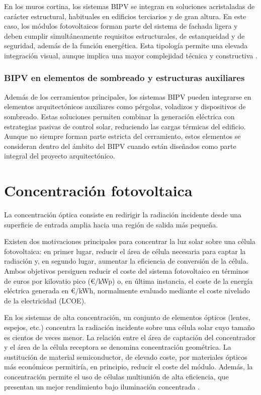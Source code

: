 En los muros cortina, los sistemas BIPV se integran en soluciones acristaladas de carácter estructural, habituales en edificios terciarios y de gran altura. En este caso, los módulos fotovoltaicos forman parte del sistema de fachada ligera y deben cumplir simultáneamente requisitos estructurales, de estanqueidad y de seguridad, además de la función energética. Esta tipología permite una elevada integración visual, aunque implica una mayor complejidad técnica y constructiva \cite{Baljit2016}.

\subsubsection{BIPV en elementos de sombreado y estructuras auxiliares}

Además de los cerramientos principales, los sistemas BIPV pueden integrarse en elementos arquitectónicos auxiliares como pérgolas, voladizos y dispositivos de sombreado. Estas soluciones permiten combinar la generación eléctrica con estrategias pasivas de control solar, reduciendo las cargas térmicas del edificio. Aunque no siempre forman parte estricta del cerramiento, estos elementos se consideran dentro del ámbito del BIPV cuando están diseñados como parte integral del proyecto arquitectónico.

\section{Concentración fotovoltaica}
La concentración óptica consiste en redirigir la radiación incidente desde una superficie de entrada amplia hacia una región de salida más pequeña.

Existen dos motivaciones principales para concentrar la luz solar sobre una célula fotovoltaica: en primer lugar, reducir el área de célula necesaria para captar la radiación y, en segundo lugar, aumentar la eficiencia de conversión de la célula. Ambos objetivos persiguen reducir el coste del sistema fotovoltaico en términos de euros por kilovatio pico (€/kWp) o, en última instancia, el coste de la energía eléctrica generada en €/kWh, normalmente evaluado mediante el coste nivelado de la electricidad (LCOE).

En los sistemas de alta concentración, un conjunto de elementos ópticos (lentes, espejos, etc.) concentra la radiación incidente sobre una célula solar cuyo tamaño es cientos de veces menor. La relación entre el área de captación del concentrador y el área de la célula receptora se denomina concentración geométrica. La sustitución de material semiconductor, de elevado coste, por materiales ópticos más económicos permitiría, en principio, reducir el coste del módulo. Además, la concentración permite el uso de células multiunión de alta eficiencia, que presentan un mejor rendimiento bajo iluminación concentrada \cite{cesar2012}.

